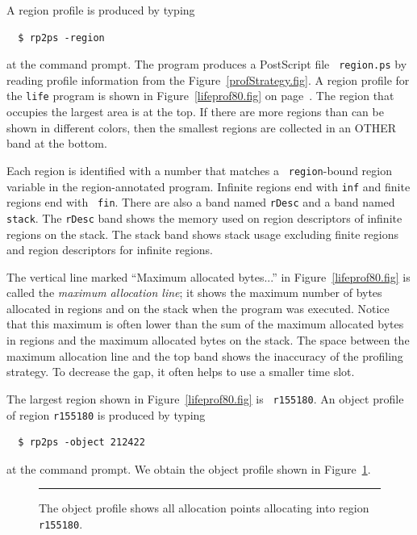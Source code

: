 \documentclass[12pt]{book}
\begin{document}
A
%
%
region profile is produced by typing
\begin{verbatim}
  $ rp2ps -region
\end{verbatim}
at the command prompt. The program produces a PostScript file {\tt
  region.ps} by reading profile information from the %
Figure~\ref{profStrategy.fig}.  A region profile for the {\tt life}
program is shown in Figure~\ref{lifeprof80.fig} on
page~\pageref{lifeprof80.fig}. The region that occupies the largest
area is at the top. If there are more regions than can be shown in
different colors, then the smallest regions are collected in an OTHER
band at the bottom.

Each region is identified with a number that matches a {\tt
  region}-bound region variable in the region-annotated program.
Infinite regions end with {\tt inf} and finite regions end with {\tt
  fin}. There are also a band named {\tt rDesc} and a band named
{\tt stack}. The {\tt rDesc} band shows the memory used on
region descriptors of infinite regions on the stack. The stack band
shows stack usage excluding finite regions and region descriptors for
infinite regions.

The vertical line marked ``Maximum allocated bytes...'' in
Figure~\ref{lifeprof80.fig} is called the {\em maximum allocation
  line}; it shows the maximum number of bytes allocated in regions and
on the stack when the program was executed. Notice that this maximum
is often lower than the sum of the maximum allocated bytes in regions
and the maximum allocated bytes on the stack. The space between the
maximum allocation line and the top band shows the inaccuracy of the
profiling strategy. To decrease the gap, it often helps to use a
smaller time slot.

The largest region shown in Figure~\ref{lifeprof80.fig} is {\tt
  r155180}. An
%
%
object profile of region {\tt r155180} is produced by typing
\begin{verbatim}
  $ rp2ps -object 212422
\end{verbatim}
at the command prompt. We obtain the object profile shown in
Figure~\ref{prof_eks2.fig}.
\begin{figure}
\caption{The object profile shows all allocation points allocating into region {\tt r155180}.}
\label{prof_eks2.fig}
\medskip\hrule
\end{figure}
\end{document}
